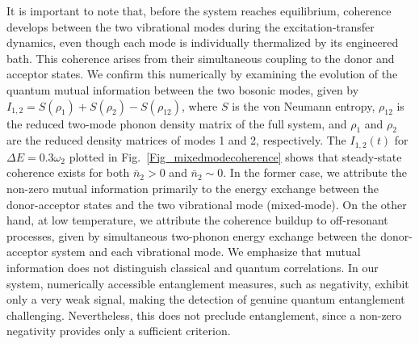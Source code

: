 \documentclass[%
reprint,
superscriptaddress,
amsmath,amssymb,
aps,
prl,
floatfix,
]{revtex4-2}
\begin{document}
It is important to note that, before the system reaches equilibrium, coherence develops between the two vibrational modes during the excitation-transfer dynamics, even though each mode is individually thermalized by its engineered bath. This coherence arises from their simultaneous coupling to the donor and acceptor states. We confirm this numerically by examining the evolution of the quantum mutual information between the two bosonic modes, given by $I_{1,2}=S(\rho_1)+S(\rho_2)-S(\rho_{12})$, where $S$ is the von Neumann entropy, $\rho_{12}$ is the reduced two-mode phonon density matrix of the full system, and $\rho_1$ and $\rho_2$ are the reduced density matrices of modes 1 and 2, respectively. The $I_{1,2}(t)$ for $\Delta E = 0.3\omega_2$ plotted in Fig.~\ref{Fig_mixedmodecoherence} shows that steady-state coherence exists for both $\bar{n}_2>0$ and $\bar{n}_2\sim0$. In the former case, we attribute the non-zero mutual information primarily to the energy exchange between the donor-acceptor states and the two vibrational mode (mixed-mode). On the other hand, at low temperature, we attribute the coherence buildup to off-resonant processes, given by simultaneous two-phonon energy exchange between the donor-acceptor system and each vibrational mode. We emphasize that mutual information does not distinguish classical and quantum correlations. In our system, numerically accessible entanglement measures, such as negativity, exhibit only a very weak signal, making the detection of genuine quantum entanglement challenging. Nevertheless, this does not preclude entanglement, since a non-zero negativity provides only a sufficient criterion.
\end{document}
